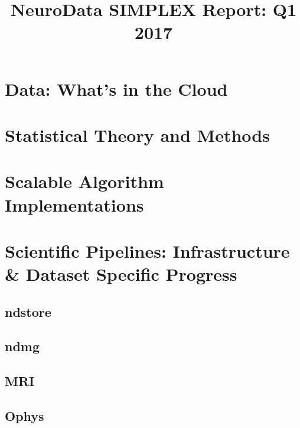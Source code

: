 \documentclass[12pt]{article}
\title{NeuroData SIMPLEX Report: Q1 2017}
\begin{document}

\newpage


\section{Data: What's in the Cloud}

\clearpage


\section{Statistical Theory and Methods}







%

%
%
%

\section{Scalable Algorithm Implementations}







\section{Scientific Pipelines: Infrastructure \& Dataset Specific
  Progress}


\subsection{ndstore}
\subsection{ndmg}

\subsection{MRI}

\subsection{Ophys}






\end{document}
